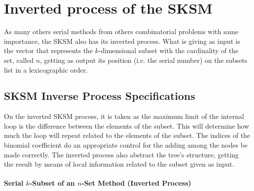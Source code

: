 \documentclass {amsart}
\begin{document}
\section*{Inverted process of the SKSM}

As many others serial methods from others combinatorial problems
with same importance\cite{me}\cite{me1}\cite{me2}, the SKSM also
has its inverted process. What is giving as input is the vector
that represents the {$k$}-dimensional subset with the cardinality
of the set, called {$n$}, getting as output its position (i.e. the
serial number) on the subsets list in a lexicographic order.


\subsection*{SKSM Inverse Process Specifications}

On the inverted SKSM process, it is taken as the maximum limit of
the internal loop is the difference between the elements of the
subset. This will determine how much the loop will repeat related
to the elements of the subset. The indices of the binomial
coefficient do an appropriate control for the adding among the
nodes be made correctly. The inverted process also abstract the
tree's structure, getting the result by means of local information
related to the subset given as input.\\\\
\textbf{Serial {$k$}-Subset of an {$n$}-Set Method (Inverted
Process)}
\end{document}
